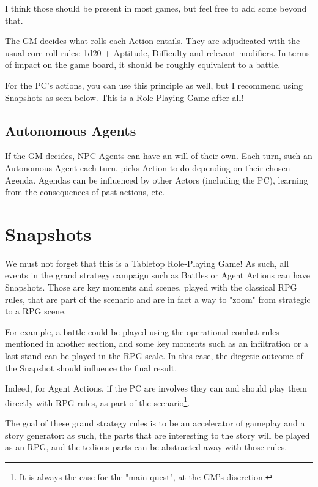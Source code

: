 I think those should be present in most games, but feel free to add some beyond that. 

The GM decides what rolls each Action entails. They are adjudicated with the usual core roll rules: 1d20 + Aptitude, Difficulty and relevant modifiers. In terms of impact on the game board, it should be roughly equivalent to a battle.

For the PC's actions, you can use this principle as well, but I recommend using Snapshots as seen below. This is a Role-Playing Game after all!


\subsection{Autonomous Agents}

If the GM decides, NPC Agents can have an will of their own. Each turn, such an Autonomous Agent each turn, picks Action to do depending on their chosen Agenda. Agendas can be influenced by other Actors (including the PC), learning from the consequences of past actions, etc.



\section{Snapshots}

We must not forget that this is a Tabletop Role-Playing Game! As such, all events in the grand strategy campaign such as Battles or Agent Actions can have Snapshots. Those are key moments and scenes, played with the classical RPG rules, that are part of the scenario and are in fact a way to "zoom" from strategic to a RPG scene.

For example, a battle could be played using the operational combat rules mentioned in another section, and some key moments such as an infiltration or a last stand can be played in the RPG scale. In this case, the diegetic outcome of the Snapshot should influence the final result.

Indeed, for Agent Actions, if the PC are involves they can and should play them directly with RPG rules, as part of the scenario\footnote{It is always the case for the "main quest", at the GM's discretion.}.

The goal of these grand strategy rules is to be an accelerator of gameplay and a story generator: as such, the parts that are interesting to the story will be played as an RPG, and the tedious parts can be abstracted away with those rules.


